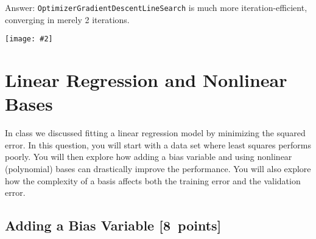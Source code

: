 \documentclass{article}
\newenvironment{answer}{\par\begingroup\color{gre}Answer: }{\endgroup}
\newcommand\pts[1]{\textcolor{pointscolour}{[#1~points]}}
\newcommand{\centerfig}[2]{\begin{center}\texttt{[image: \#2]}\end{center}}
\begin{document}
\begin{answer}
    \texttt{OptimizerGradientDescentLineSearch} is much more iteration-efficient, converging in merely 2 iterations.
\end{answer}
\centerfig{0.7}{figs/gd_learning_curves}

\clearpage
\section{Linear Regression and Nonlinear Bases}

In class we discussed fitting a linear regression model by minimizing the squared error.
In this question, you will start with a data set where least squares performs poorly.
You will then explore how adding a bias variable and using nonlinear (polynomial) bases can drastically improve the performance.
You will also explore how the complexity of a basis affects both the training error and the validation error.

\subsection{Adding a Bias Variable \pts{8}}
\end{document}

